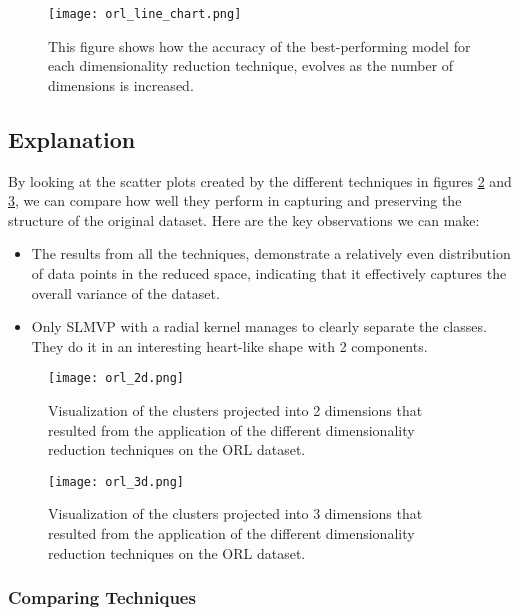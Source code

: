 \begin{figure}[!ht]
    \centering
    \texttt{[image: orl\_line\_chart.png]}
    \caption{This figure shows how the accuracy of the best-performing model for each dimensionality reduction technique, evolves as the number of dimensions is increased.}
    \label{fig:orl_line_chart}
\end{figure}

\subsection{Explanation}

By looking at the scatter plots created by the different techniques in figures \ref{fig:orl-2d} and \ref{fig:orl-3d}, we can compare how well they perform in capturing and preserving the structure of the original dataset. Here are the key observations we can make:

\begin{itemize}
    \item The results from all the techniques, demonstrate a relatively even distribution of data points in the reduced space, indicating that it effectively captures the overall variance of the dataset.
    \item Only SLMVP with a radial kernel manages to clearly separate the classes. They do it in an interesting heart-like shape with 2 components.
\end{itemize}

\begin{figure}[!h]
    \centering
    \texttt{[image: orl\_2d.png]}
    \caption{Visualization of the clusters projected into 2 dimensions that resulted from the application of the different dimensionality reduction techniques on the ORL dataset.}
    \label{fig:orl-2d}
\end{figure}

\begin{figure}[!h]
    \centering
    \texttt{[image: orl\_3d.png]}
    \caption{Visualization of the clusters projected into 3 dimensions that resulted from the application of the different dimensionality reduction techniques on the ORL dataset.}
    \label{fig:orl-3d}
\end{figure}

\subsubsection{Comparing Techniques}

